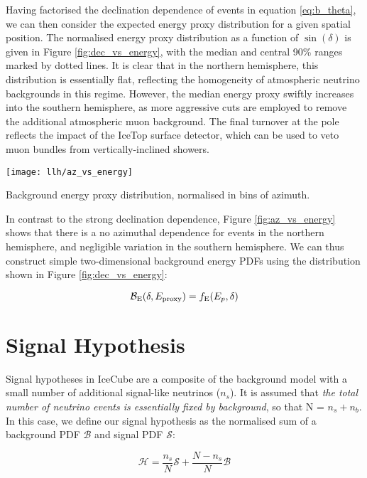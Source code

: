 Having factorised the declination dependence of events in equation \ref{eq:b_theta}, we can then consider the expected energy proxy distribution for a given spatial position. The normalised energy proxy distribution as a function of $\sin(\delta)$ is given in Figure \ref{fig:dec_vs_energy}, with the median and central 90\% ranges marked by dotted lines. It is clear that in the northern hemisphere, this distribution is essentially flat, reflecting the homogeneity of atmospheric neutrino backgrounds in this regime. However, the median energy proxy swiftly increases into the southern hemisphere, as more aggressive cuts are employed to remove the additional atmospheric muon background. The final turnover at the pole reflects the impact of the IceTop surface detector, which can be used to veto muon bundles from vertically-inclined showers.

\begin{marginfigure}
	\centering \texttt{[image: llh/az\_vs\_energy]}
	\caption{Background energy proxy distribution, normalised in bins of azimuth.}
	\label{fig:az_vs_energy}
\end{marginfigure}

In contrast to the strong declination dependence, Figure \ref{fig:az_vs_energy} shows that there is a no azimuthal dependence for events in the northern hemisphere, and negligible variation in the southern hemisphere. We can thus construct simple two-dimensional background energy PDFs using the distribution shown in Figure \ref{fig:dec_vs_energy}:

\begin{equation}
\mathcal{B}_{\textup{E}} (\delta, E_{\textup{proxy}}) = f_{\textup{E}}(E_{p}, \delta)
\label{eq:b_energy}
\end{equation}

\section{Signal Hypothesis}
\label{sec:signal}

Signal hypotheses in IceCube are a composite of the background model with a small number of additional signal-like neutrinos ($n_{s}$). It is assumed that \emph{the total number of neutrino events is essentially fixed by background}, so that N = $n_{s} + n_{b}$. In this case, we define our signal hypothesis as the normalised sum of a background PDF $\mathcal{B}$ and signal PDF $\mathcal{S}$:

\begin{equation}
\mathcal{H}= \frac{n_{s}}{N} \mathcal{S} + \frac{N - n_{s}}{N} \mathcal{B} 
\label{eq:sig_hypo_single}
\end{equation}

